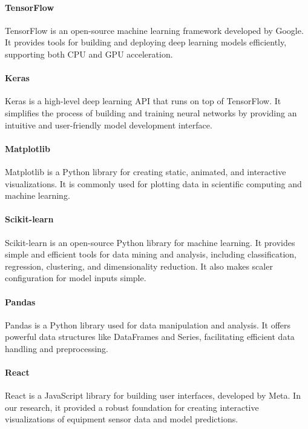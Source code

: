 \paragraph{TensorFlow} TensorFlow is an open-source machine learning framework developed by Google. It provides tools for building and deploying deep learning models efficiently, supporting both CPU and GPU acceleration.

\paragraph{Keras} Keras is a high-level deep learning API that runs on top of TensorFlow. It simplifies the process of building and training neural networks by providing an intuitive and user-friendly model development interface.

\paragraph{Matplotlib} Matplotlib is a Python library for creating static, animated, and interactive visualizations. It is commonly used for plotting data in scientific computing and machine learning.

\paragraph{Scikit-learn} Scikit-learn is an open-source Python library for machine learning. It provides simple and efficient tools for data mining and analysis, including classification, regression, clustering, and dimensionality reduction. It also makes scaler configuration for model inputs simple.

\paragraph{Pandas} Pandas is a Python library used for data manipulation and analysis. It offers powerful data structures like DataFrames and Series, facilitating efficient data handling and preprocessing.

\paragraph{React} React is a JavaScript library for building user interfaces, developed by Meta. In our research, it provided a robust foundation for creating interactive visualizations of equipment sensor data and model predictions.

